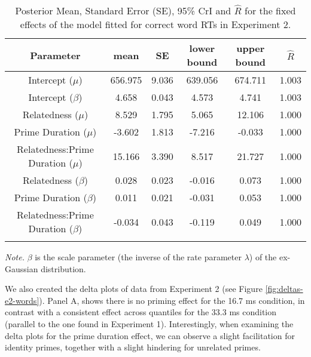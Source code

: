 \documentclass[
  english,
  man,floatsintext]{apa6}
\begin{document}
\begin{table}[H]

\begin{center}
\begin{threeparttable}

\caption{\label{tab:exp2-blmm-table}Posterior Mean, Standard Error (SE), 95\% CrI and \(\hat{R}\) for the fixed effects of the model fitted for correct word RTs in Experiment 2.}

\small{

\begin{tabular}{cccccc}
\toprule
Parameter & \multicolumn{1}{c}{mean} & \multicolumn{1}{c}{SE} & \multicolumn{1}{c}{lower bound} & \multicolumn{1}{c}{upper bound} & \multicolumn{1}{c}{$\hat{R}$}\\
\midrule
Intercept ($\mu$) & 656.975 & 9.036 & 639.056 & 674.711 & 1.003\\
Intercept ($\beta$) & 4.658 & 0.043 & 4.573 & 4.741 & 1.003\\
Relatedness ($\mu$) & 8.529 & 1.795 & 5.065 & 12.106 & 1.000\\
Prime Duration ($\mu$) & -3.602 & 1.813 & -7.216 & -0.033 & 1.000\\
Relatedness:Prime Duration ($\mu$) & 15.166 & 3.390 & 8.517 & 21.727 & 1.000\\
Relatedness ($\beta$) & 0.028 & 0.023 & -0.016 & 0.073 & 1.000\\
Prime Duration ($\beta$) & 0.011 & 0.021 & -0.031 & 0.053 & 1.000\\
Relatedness:Prime Duration ($\beta$) & -0.034 & 0.043 & -0.119 & 0.049 & 1.000\\
\bottomrule
\addlinespace
\end{tabular}

}

\begin{tablenotes}[para]
\normalsize{\textit{Note.} $\beta$ is the scale parameter (the inverse of the rate parameter $\lambda$) of the ex-Gaussian distribution.}
\end{tablenotes}

\end{threeparttable}
\end{center}

\end{table}

We also created the delta plots of data from Experiment 2 (see Figure \ref{fig:deltas-e2-words}). Panel A, shows there is no priming effect for the 16.7 ms condition, in contrast with a consistent effect across quantiles for the 33.3 ms condition (parallel to the one found in Experiment 1). Interestingly, when examining the delta plots for the prime duration effect, we can observe a slight facilitation for identity primes, together with a slight hindering for unrelated primes.
\end{document}
